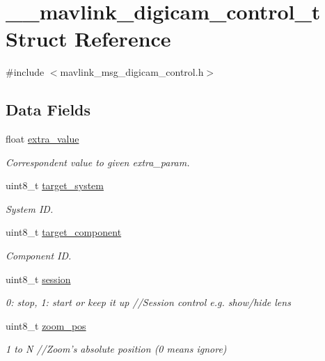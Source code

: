 \hypertarget{struct____mavlink__digicam__control__t}{\section{\+\_\+\+\_\+mavlink\+\_\+digicam\+\_\+control\+\_\+t Struct Reference}
\label{struct____mavlink__digicam__control__t}
}


{\ttfamily \#include $<$mavlink\+\_\+msg\+\_\+digicam\+\_\+control.\+h$>$}

\subsection*{Data Fields}
\begin{DoxyCompactItemize}
\item 
float \hyperlink{struct____mavlink__digicam__control__t_ad1a5e51e06068d73310cd77623ab720c}{extra\+\_\+value}
\begin{DoxyCompactList}\small\item\em Correspondent value to given extra\+\_\+param. \end{DoxyCompactList}\item 
uint8\+\_\+t \hyperlink{struct____mavlink__digicam__control__t_a934cd12cf8f6d0e49aeeec433bef503f}{target\+\_\+system}
\begin{DoxyCompactList}\small\item\em System I\+D. \end{DoxyCompactList}\item 
uint8\+\_\+t \hyperlink{struct____mavlink__digicam__control__t_a9d1f15c5844ba5571b3836e0db2e01da}{target\+\_\+component}
\begin{DoxyCompactList}\small\item\em Component I\+D. \end{DoxyCompactList}\item 
uint8\+\_\+t \hyperlink{struct____mavlink__digicam__control__t_aee93a31e833bd6e67a650fc9c4cbbcb3}{session}
\begin{DoxyCompactList}\small\item\em 0\+: stop, 1\+: start or keep it up //\+Session control e.\+g. show/hide lens \end{DoxyCompactList}\item 
uint8\+\_\+t \hyperlink{struct____mavlink__digicam__control__t_aafd3d960b150853d157257cde74d8cfa}{zoom\+\_\+pos}
\begin{DoxyCompactList}\small\item\em 1 to N //\+Zoom's absolute position (0 means ignore) \end{DoxyCompactList}\item 

\end{DoxyCompactItemize}
